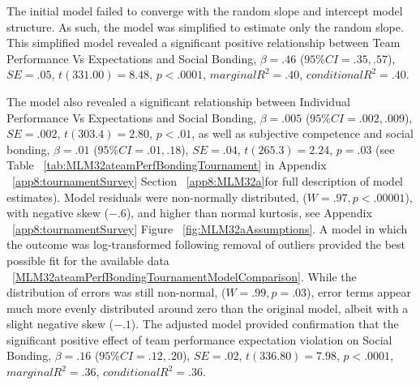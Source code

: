 \begin{CJK}{UTF8}{gbsn}
  The initial model failed to converge with the random slope and intercept model structure.  As such, the model was simplified to estimate only the random slope. This simplified model revealed a significant positive relationship between Team Performance Vs Expectations and Social Bonding, $\beta = .46$ ($95\% CI =  .35, .57$), $SE = .05$, $t(331.00) = 8.48$, $p < .0001$, $marginal R^2 = .40$, $conditional R^2 = .40$.

  The model also revealed a significant relationship between Individual Performance Vs Expectations and Social Bonding, $\beta = .005$ ($95\% CI =  .002, .009$), $SE = .002$, $t(303.4) = 2.80$, $p < .01$, as well as subjective competence and social bonding, $\beta = .01$ ($95\% CI =  .01, .18$), $SE = .04$, $t(265.3) = 2.24$, $p = .03$ (see Table ~\ref{tab:MLM32ateamPerfBondingTournament} in Appendix ~\ref{app8:tournamentSurvey} Section ~\ref{app8:MLM32a}for full description of model estimates).  Model residuals were non-normally distributed, ($W = .97, p < .00001$), with negative skew ($-.6$), and higher than normal kurtosis, see Appendix ~\ref{app8:tournamentSurvey} Figure ~\ref{fig:MLM32aAssumptions}.  A model in which the outcome was log-transformed following removal of outliers provided the best possible fit for the available data ~\ref{MLM32ateamPerfBondingTournamentModelComparison}. While the distribution of errors was still non-normal, ($W = .99, p = .03$),  error terms appear much more evenly distributed around zero than the original model, albeit with a slight negative skew ($-.1$).
  The adjusted model provided confirmation that the significant positive effect of team performance expectation violation on Social Bonding,  $\beta = .16$ ($95\% CI =  .12, .20$), $SE = .02$, $t(336.80) = 7.98$, $p < .0001$, $marginal R^2 = .36$, $conditional R^2 = .36$.



\end{CJK}
